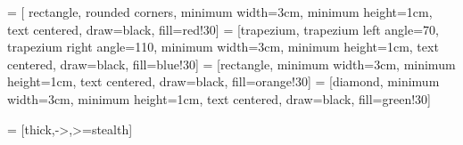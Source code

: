 \usepackage{tikz}
\usetikzlibrary{shapes.geometric, arrows}
 = [
    rectangle, 
    rounded corners, 
    minimum width=3cm, 
    minimum height=1cm,
    text centered, 
    draw=black, 
    fill=red!30]
 = [trapezium,
    trapezium left angle=70,
    trapezium right angle=110,
    minimum width=3cm,
    minimum height=1cm,
    text centered,
    draw=black,
    fill=blue!30]
 = [rectangle,
    minimum width=3cm,
    minimum height=1cm,
    text centered,
    draw=black,
    fill=orange!30]
 = [diamond,
    minimum width=3cm,
    minimum height=1cm,
    text centered,
    draw=black,
    fill=green!30]

 = [thick,->,>=stealth]